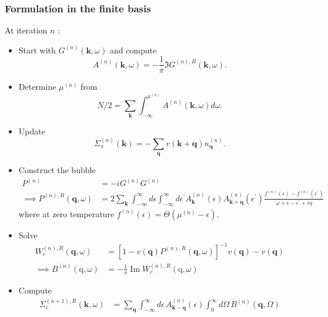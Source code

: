 \subsubsection{Formulation in the finite basis}
At iteration $n$ :
\begin{itemize}
\item[1.] Start with $G^{(n)}(\mathbf{k}, \omega)$ and compute
\begin{equation}
    A^{(n)}(\mathbf{k}, \omega)=-\frac{1}{\pi} \Im G^{(n), R}(\mathbf{k}, \omega) .
\end{equation}
\item[2.] Determine $\mu^{(n)}$ from
\begin{equation}
N / 2=\sum_{\mathbf{k}} \int^{\mu^{(n)}}_{-\infty} A^{(n)}(\mathbf{k}, \omega) d \omega .
\end{equation}
\item[3.] Update
\begin{equation}
    \Sigma_x^{(n)}(\mathbf{k})=-\sum_{\mathbf{q}} v(\mathbf{k}+\mathbf{q}) n_{\mathbf{q}}^{(n)} .
\end{equation}
\item[4.] Construct the bubble
\begin{align}
P^{(n)}&=-i G^{(n)} G^{(n)} \\
\implies
P^{(n), R}(\mathbf{q}, \omega)&=2 \sum_{\mathbf{k}} \int_{-\infty}^{\infty} d \epsilon \int_{-\infty}^{\infty} d \epsilon^{\prime} A_{\mathbf{k}}^{(n)}(\epsilon) A_{\mathbf{k}+\mathbf{q}}^{(n)}\left(\epsilon^{\prime}\right) \frac{f^{(n)}(\epsilon)-f^{(n)}\left(\epsilon^{\prime}\right)}{\omega+\epsilon-\epsilon^{\prime}+i \eta} 
\end{align}
where at zero temperature $f^{(n)}(\epsilon)=\Theta\left(\mu^{(n)}-\epsilon\right)$.
\item[5.] Solve
\begin{align}
W_c^{(n),R}(\mathbf{q}, \omega)&=\left[1-v(\mathbf{q}) P^{(n), R}(\mathbf{q}, \omega)\right]^{-1} v(\mathbf{q}) - v(\mathbf{q}) \\
\implies B^{(n)}(\mathrm{q}, \omega)&=-\frac{1}{\pi} \operatorname{Im} W_c^{(n), R}(\mathrm{q}, \omega)
\end{align}
\item[6.] Compute
\begin{align}
    \Sigma_{c}^{(n+1),R}(\mathbf{k}, \omega)
    &=
    \sum_{\mathbf{q}}
    \int_{-\infty}^{\infty}d\epsilon\,
    A_{\mathbf{k}-\mathbf{q}}^{(n)}(\epsilon)
    \int_0^\infty d\Omega\,
    B_{}^{(n)}(\mathbf{q}, \Omega)
    \nonumber\\

\end{align}
\end{itemize}
